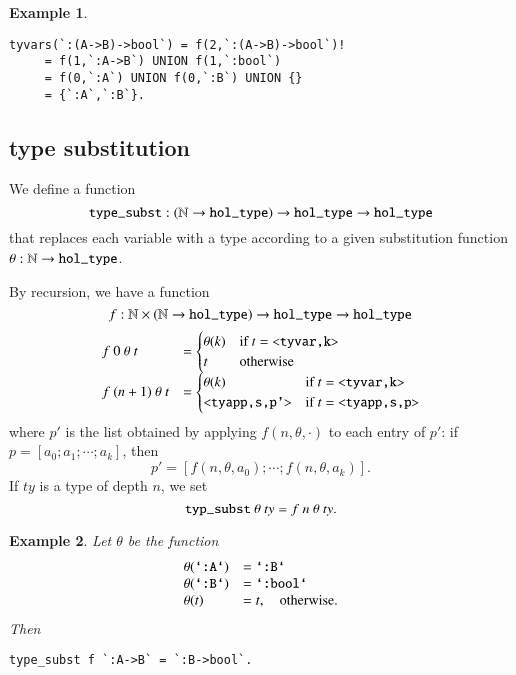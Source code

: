 \documentclass[cup9a]{cupbook}
\newtheorem{example}{Example}[chapter]
\begin{document}
\begin{example}
\begin{verbatim}
tyvars(`:(A->B)->bool`) = f(2,`:(A->B)->bool`)! 
     = f(1,`:A->B`) UNION f(1,`:bool`)
     = f(0,`:A`) UNION f(0,`:B`) UNION {}
     = {`:A`,`:B`}.
\end{verbatim}
\end{example}

\subsection{type substitution}

We define a function
$$
\verb!type_subst!:(\ring{N}\to \verb!hol_type!)\to \verb!hol_type! \to \verb!hol_type!
$$
that replaces each variable with a type according to a given substitution function $\theta:\ring{N}\to \verb!hol_type!$.

By recursion, we have a function 
$$f:\ring{N}\times (\ring{N}\to \verb!hol_type!)\to \verb!hol_type! \to \verb!hol_type!$$
$$
\begin{array}{lll}
f~0~\theta~t &=\begin{cases} \theta(k) &\hbox{if } t = \verb!<tyvar,k>!\\ t &\hbox{otherwise}\end{cases}\\
f~(n+1)~\theta~t &=\begin{cases} \theta(k) &\hbox{if } t = \verb!<tyvar,k>!\\ \verb!<tyapp,s,p'>! &\hbox{if } t = \verb!<tyapp,s,p>!\end{cases}\\
\end{array}
$$
where $p'$ is the list obtained by applying $f(n,\theta,\cdot)$ to each entry of $p'$:
if $p=[a_0;a_1;\cdots;a_k]$, then
$$
p' = [f(n,\theta,a_0);\cdots;f(n,\theta,a_k)].
$$
If $ty$ is a type of depth $n$, we set
\begin{equation}
\verb!typ_subst!~\theta~ty = f~n~\theta~ty.
\end{equation}

\begin{example}
Let $\theta$ be the function
$$
\begin{array}{lll}
\theta(\verb!`:A`!) &=\verb!`:B`!\\
\theta(\verb!`:B`!) &=\verb!`:bool`!\\
\theta(t) &= t,\quad\hbox{otherwise}.
\end{array}
$$
Then
\begin{verbatim}
type_subst f `:A->B` = `:B->bool`.
\end{verbatim}
\end{example}
\end{document}
